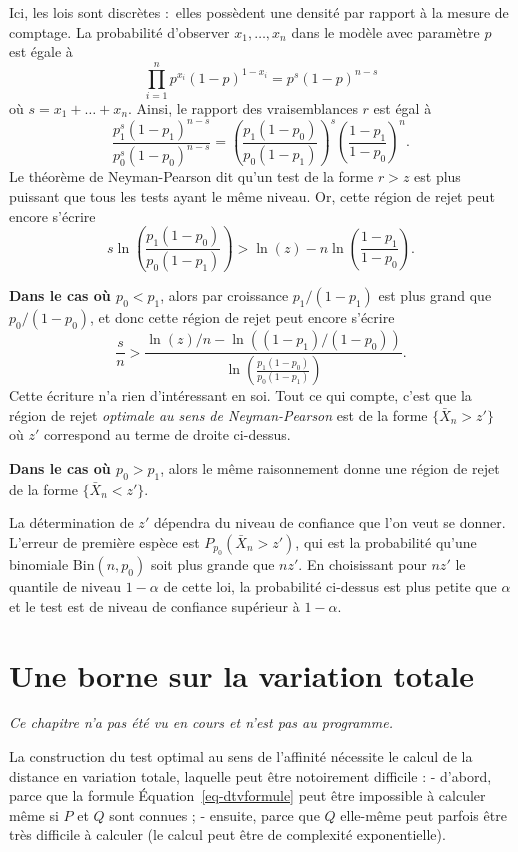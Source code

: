 \documentclass[
  10,
  letterpaper,
  DIV=11,
  numbers=noendperiod]{scrreport}
\theoremstyle{plain}
\theoremstyle{definition}
\theoremstyle{plain}
\theoremstyle{definition}
\theoremstyle{definition}
\theoremstyle{plain}
\theoremstyle{remark}
\begin{document}
Ici, les lois sont discrètes :~elles possèdent une densité par rapport à
la mesure de comptage. La probabilité d'observer \(x_1, \dotsc, x_n\)
dans le modèle avec paramètre \(p\) est égale à
\[\prod_{i=1}^n p^{x_i}(1-p)^{1-x_i} = p^s(1-p)^{n-s}\] où
\(s = x_1 + \dotsc + x_n\). Ainsi, le rapport des vraisemblances \(r\)
est égal à
\[\frac{p_1^s (1-p_1)^{n-s}}{p_0^s(1-p_0)^{n-s}} = \left(\frac{p_1(1-p_0)}{p_0(1-p_1)}\right)^s\left(\frac{1-p_1}{1-p_0}\right)^n. \]
Le théorème de Neyman-Pearson dit qu'un test de la forme \(r>z\) est
plus puissant que tous les tests ayant le même niveau. Or, cette région
de rejet peut encore s'écrire
\[ s \ln \left(\frac{p_1(1-p_0)}{p_0(1-p_1)}\right) > \ln(z) - n\ln\left(\frac{1-p_1}{1-p_0}\right).\]

\textbf{Dans le cas où \(p_0<p_1\)}, alors par croissance
\(p_1 / (1-p_1)\) est plus grand que \(p_0/(1-p_0)\), et donc cette
région de rejet peut encore s'écrire
\[ \frac{s}{n} > \frac{\ln(z)/n - \ln((1-p_1)/(1-p_0))}{\ln \left(\frac{p_1(1-p_0)}{p_0(1-p_1)}\right) }.\]
Cette écriture n'a rien d'intéressant en soi. Tout ce qui compte, c'est
que la région de rejet \emph{optimale au sens de Neyman-Pearson} est de
la forme \(\{\bar{X}_n > z'\}\) où \(z'\) correspond au terme de droite
ci-dessus.

\textbf{Dans le cas où \(p_0>p_1\)}, alors le même raisonnement donne
une région de rejet de la forme \(\{\bar{X}_n < z'\}\).

La détermination de \(z'\) dépendra du niveau de confiance que l'on veut
se donner. L'erreur de première espèce est \(P_{p_0}(\bar{X}_n > z')\),
qui est la probabilité qu'une binomiale \(\mathrm{Bin}(n,p_0)\) soit
plus grande que \(nz'\). En choisissant pour \(nz'\) le quantile de
niveau \(1-\alpha\) de cette loi, la probabilité ci-dessus est plus
petite que \(\alpha\) et le test est de niveau de confiance supérieur à
\(1-\alpha\).

\hypertarget{une-borne-sur-la-variation-totale}{%
\section{Une borne sur la variation
totale}\label{une-borne-sur-la-variation-totale}}

\emph{Ce chapitre n'a pas été vu en cours et n'est pas au programme.}

La construction du test optimal au sens de l'affinité nécessite le
calcul de la distance en variation totale, laquelle peut être
notoirement difficile : - d'abord, parce que la formule
Équation~\ref{eq-dtvformule} peut être impossible à calculer même si
\(P\) et \(Q\) sont connues ; - ensuite, parce que \(Q\) elle-même peut
parfois être très difficile à calculer (le calcul peut être de
complexité exponentielle).
\end{document}

